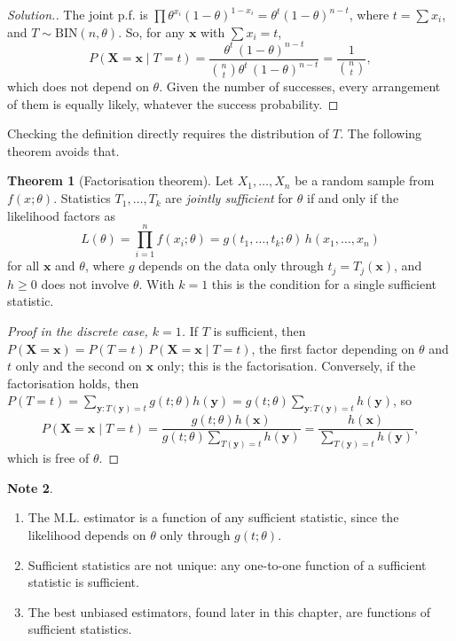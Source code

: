 \documentclass[12pt,a4paper]{report}
\theoremstyle{definition}
\newtheorem{thm}{Theorem}[section]
\newtheorem{note}[thm]{Note}
\theoremstyle{plain}
\newenvironment{solution}
  {\renewcommand{\qedsymbol}{}\begin{proof}[\textit{Solution}.]}
  {\end{proof}}
\begin{document}
\begin{solution}
The joint p.f. is $\prod \theta^{x_i}(1 - \theta)^{1 - x_i} = \theta^t(1 -
\theta)^{n - t}$, where $t = \sum x_i$, and $T\sim\text{BIN}(n,\theta)$. So, for
any $\mathbf x$ with $\sum x_i = t$,
\[P(\mathbf X = \mathbf x\mid T = t) = \frac{\theta^t\, (1 -
\theta)^{n - t}}{\binom{n}{t}\theta^t\, (1 - \theta)^{n - t}} =
\frac{1}{\binom{n}{t}} ,\]
which does not depend on $\theta$. Given the number of successes, every
arrangement of them is equally likely, whatever the success probability.
\end{solution}

Checking the definition directly requires the distribution of $T$. The following
theorem avoids that.

\begin{thm}[Factorisation theorem]
\label{thm:factorisation}
Let $X_1, \dots , X_n$ be a random sample from $f(x;\theta)$. Statistics
$T_1,\dots,T_k$ are \emph{jointly sufficient} for $\theta$ if and only if the
likelihood factors as
\[L(\theta) = \prod_{i=1}^nf(x_i;\theta) = g(t_1, \dots , t_k;\theta)\,h(x_1, \dots
, x_n)\]
for all $\mathbf x$ and $\theta$, where $g$ depends on the data only through
$t_j = T_j(\mathbf x)$, and $h\geq 0$ does not involve $\theta$. With $k = 1$ this
is the condition for a single sufficient statistic.
\end{thm}

\begin{proof}[Proof in the discrete case, $k = 1$]
If $T$ is sufficient, then $P(\mathbf X = \mathbf x) = P(T = t)\,P(\mathbf X =
\mathbf x\mid T = t)$, the first factor depending on $\theta$ and $t$ only and the
second on $\mathbf x$ only; this is the factorisation. Conversely, if the
factorisation holds, then
$P(T = t) = \sum_{\mathbf y : T(\mathbf y) = t}g(t;\theta)h(\mathbf y) =
g(t;\theta)\sum_{\mathbf y : T(\mathbf y) = t}h(\mathbf y)$, so
\[P(\mathbf X = \mathbf x\mid T = t) = \frac{g(t;\theta)h(\mathbf
x)}{g(t;\theta)\sum_{T(\mathbf y) = t}h(\mathbf y)} = \frac{h(\mathbf
x)}{\sum_{T(\mathbf y) = t}h(\mathbf y)} ,\]
which is free of $\theta$.
\end{proof}

\begin{note}
\begin{enumerate}
\item The M.L. estimator is a function of any sufficient statistic, since the
likelihood depends on $\theta$ only through $g(t;\theta)$.
\item Sufficient statistics are not unique: any one-to-one function of a
sufficient statistic is sufficient.
\item The best unbiased estimators, found later in this chapter, are functions
of sufficient statistics.
\end{enumerate}
\end{note}
\end{document}
